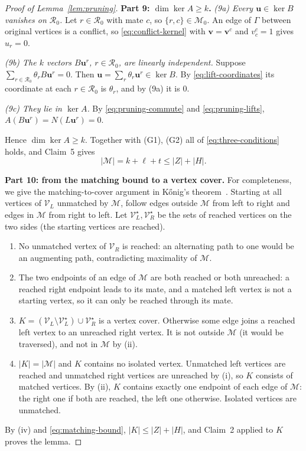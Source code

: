 \documentclass[11pt]{article}
\theoremstyle{remark}
\newcommand{\abs}[1]{\lvert #1\rvert}
\newcommand{\Step}[1]{\par\medskip\noindent\textbf{#1}\enspace}
\newcommand{\cR}{\mathcal R}
\newcommand{\cM}{\mathcal M}
\newcommand{\cV}{\mathcal V}
\newcommand{\bu}{\mathbf u}
\newcommand{\bv}{\mathbf v}
\begin{document}
\begin{proof}[Proof of Lemma~\ref{lem:pruning}]
\Step{Part 9: $\dim\ker A\ge k$.}
\emph{(9a) Every $\bu\in\ker B$ vanishes on $\cR_0$.}
Let $r\in\cR_0$ with mate $c$, so $\{r,c\}\in\cM_0$. An edge of $\Gamma$
between original vertices is a conflict, so \eqref{eq:conflict-kernel} with
$\bv=\bv^c$ and $v^c_c=1$ gives $u_r=0$.

\smallskip\noindent\emph{(9b) The $k$ vectors $B\bu^r$, $r\in\cR_0$, are
linearly independent.} Suppose $\sum_{r\in\cR_0}\theta_rB\bu^r=0$. Then
$\bu=\sum_{r}\theta_r\bu^r\in\ker B$. By \eqref{eq:lift-coordinates} its
coordinate at each $r\in\cR_0$ is $\theta_r$, and by (9a) it is $0$.

\smallskip\noindent\emph{(9c) They lie in $\ker A$.}
By \eqref{eq:pruning-commute} and \eqref{eq:pruning-lifts},
$A(B\bu^r)=N(L\bu^r)=0$.

Hence $\dim\ker A\ge k$. Together with (G1), (G2) all of
\eqref{eq:three-conditions} holds, and Claim~5 gives
\begin{equation}\label{eq:matching-bound}
 \abs{\cM}=k+\ell+t\le\abs Z+\abs H .
\end{equation}

\Step{Part 10: from the matching bound to a vertex cover.}
For completeness, we give the matching-to-cover argument in
K\H{o}nig's theorem~\cite{konig1931}. Starting at all vertices of
$\cV_L$ unmatched by $\cM$, follow edges outside $\mathcal M$ from left to
right and edges in $\mathcal M$ from right to left. Let
$\cV_L^{\star},\cV_R^{\star}$ be the sets of reached vertices on the two
sides (the starting vertices are reached).
\begin{enumerate}[label=(\roman*),leftmargin=2.2em]
\item No unmatched vertex of $\cV_R$ is reached: an alternating path to one
would be an augmenting path, contradicting maximality of $\cM$.
\item The two endpoints of an edge of $\cM$ are both reached or both
unreached: a reached right endpoint leads to its mate, and a matched left
vertex is not a starting vertex, so it can only be reached through its
mate.
\item $K=(\mathcal V_L\setminus \cV_L^{\star})\cup \cV_R^{\star}$ is a vertex
cover. Otherwise some edge joins a reached left vertex to an unreached
right vertex. It is not outside $\cM$ (it would be traversed), and not in
$\cM$ by (ii).
\item $\abs K=\abs\cM$ and $K$ contains no isolated vertex. Unmatched left
vertices are reached and unmatched right vertices are unreached by (i), so
$K$ consists of matched vertices. By (ii), $K$ contains exactly one endpoint
of each edge of $\cM$: the right one if both are reached, the left one
otherwise. Isolated vertices are unmatched.
\end{enumerate}
By (iv) and \eqref{eq:matching-bound}, $\abs K\le\abs Z+\abs H$, and Claim~2
applied to $K$ proves the lemma.
\end{proof}
\end{document}
